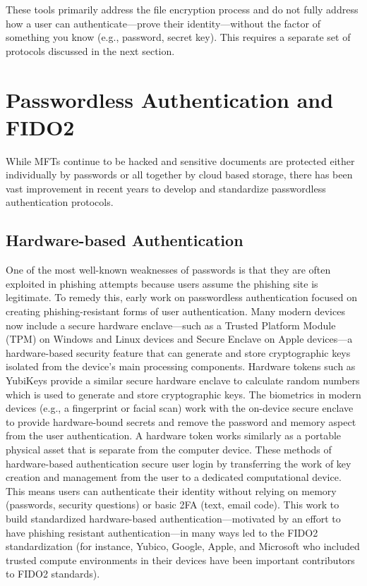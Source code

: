 These tools primarily address the file encryption process and do not fully address how a user can authenticate---prove their identity---without the factor of something you know (e.g., password, secret key). This requires a separate set of protocols discussed in the next section.

\section{Passwordless Authentication and FIDO2}
\label{sec:fido2}

While MFTs continue to be hacked and sensitive documents are protected either individually by passwords or all together by cloud based storage, there has been vast improvement in recent years to develop and standardize passwordless authentication protocols.

\subsection{Hardware-based Authentication}
\label{sec:hw-auth}

One of the most well-known weaknesses of passwords is that they are often exploited in phishing attempts because users assume the phishing site is legitimate. To remedy this, early work on passwordless authentication focused on creating phishing-resistant forms of user authentication. Many modern devices now include a secure hardware enclave---such as a Trusted Platform Module (TPM) on Windows and Linux devices and Secure Enclave on Apple devices---a hardware-based security feature that can generate and store cryptographic keys isolated from the device's main processing components. Hardware tokens such as YubiKeys provide a similar secure hardware enclave to calculate random numbers which is used to generate and store cryptographic keys. The biometrics in modern devices (e.g., a fingerprint or facial scan) work with the on-device secure enclave to provide hardware-bound secrets and remove the password and memory aspect from the user authentication. A hardware token works similarly as a portable physical asset that is separate from the computer device. These methods of hardware-based authentication secure user login by transferring the work of key creation and management from the user to a dedicated computational device. This means users can authenticate their identity without relying on memory (passwords, security questions) or basic 2FA (text, email code). This work to build standardized hardware-based authentication---motivated by an effort to have phishing resistant authentication---in many ways led to the FIDO2 standardization (for instance, Yubico, Google, Apple, and Microsoft who included trusted compute environments in their devices have been important contributors to FIDO2 standards).

